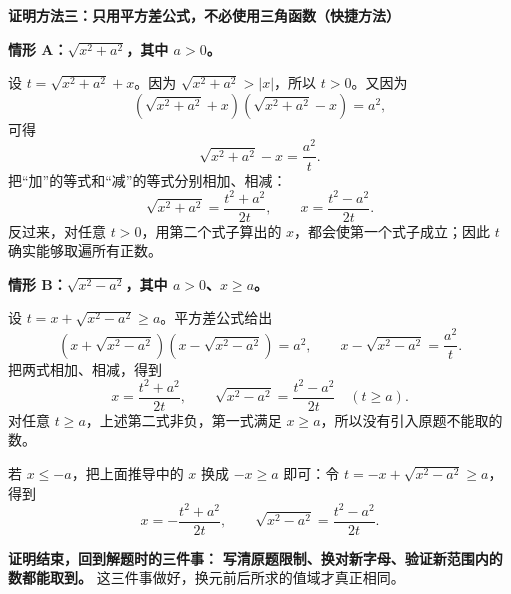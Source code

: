 \begin{proofbox}
\textbf{\textcolor{CProof}{证明方法三：只用平方差公式，不必使用三角函数（快捷方法）}}
\begin{center}\end{center}


  \textbf{情形 A：$\sqrt{x^2+a^2}$，其中 $a>0$。}

  设 $t=\sqrt{x^2+a^2}+x$。因为 $\sqrt{x^2+a^2}>|x|$，所以 $t>0$。又因为
  \[
    (\sqrt{x^2+a^2}+x)(\sqrt{x^2+a^2}-x)=a^2,
  \]
  可得
  \[
    \sqrt{x^2+a^2}-x=\frac{a^2}{t}.
  \]
  把“加”的等式和“减”的等式分别相加、相减：
  \[
    \boxed{\sqrt{x^2+a^2}=\frac{t^2+a^2}{2t}},\qquad
    \boxed{x=\frac{t^2-a^2}{2t}}.
  \]
  反过来，对任意 $t>0$，用第二个式子算出的 $x$，都会使第一个式子成立；因此 $t$ 确实能够取遍所有正数。

  \begin{center}\end{center}
\textbf{情形 B：$\sqrt{x^2-a^2}$，其中 $a>0$、$x\ge a$。}

  设 $t=x+\sqrt{x^2-a^2}\ge a$。平方差公式给出
  \[
    (x+\sqrt{x^2-a^2})(x-\sqrt{x^2-a^2})=a^2,
    \qquad x-\sqrt{x^2-a^2}=\frac{a^2}{t}.
  \]
  把两式相加、相减，得到
  \[
    \boxed{x=\frac{t^2+a^2}{2t}},\qquad
    \boxed{\sqrt{x^2-a^2}=\frac{t^2-a^2}{2t}}\quad(t\ge a).
  \]
  对任意 $t\ge a$，上述第二式非负，第一式满足 $x\ge a$，所以没有引入原题不能取的数。

  若 $x\le-a$，把上面推导中的 $x$ 换成 $-x\ge a$ 即可：令 $t=-x+\sqrt{x^2-a^2}\ge a$，得到
  \[
    x=-\frac{t^2+a^2}{2t},\qquad
    \sqrt{x^2-a^2}=\frac{t^2-a^2}{2t}.
  \]

  \medskip
  \textbf{\textcolor{CProof}{证明结束，回到解题时的三件事：}}
  \textbf{写清原题限制、换对新字母、验证新范围内的数都能取到。} 这三件事做好，换元前后所求的值域才真正相同。
\end{proofbox}
